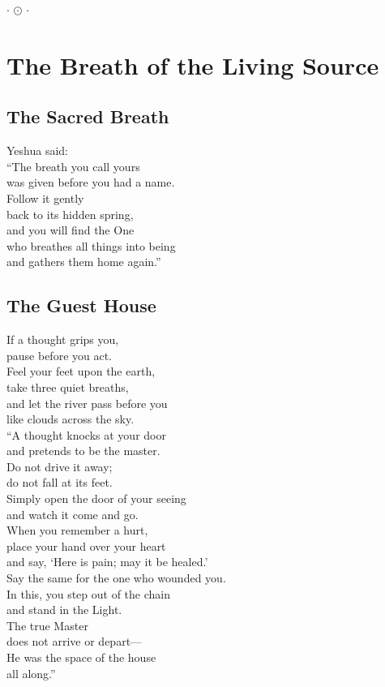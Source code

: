 \documentclass[10pt, openright]{book}
\newcommand{\sectionbreak}{\filbreak}
\newcommand{\ornament}{
    \vspace{1.5cm}
    \begin{center}
        \large \(\cdot\) \(\odot\) \(\cdot\)
    \end{center}
    \vspace{1.5cm}
}
\begin{document}
\ornament

\mainmatter

\chapter{The Breath of the Living
Source}\label{the-breath-of-the-living-source}

\sectionbreak

\section{The Sacred Breath}\label{the-sacred-breath}

Yeshua said:\\
``The breath you call yours\\
was given before you had a name.\\
Follow it gently\\
back to its hidden spring,\\
and you will find the One\\
who breathes all things into being\\
and gathers them home again.''

\sectionbreak

\section{The Guest House}\label{the-guest-house}

If a thought grips you,\\
pause before you act.\\
Feel your feet upon the earth,\\
take three quiet breaths,\\
and let the river pass before you\\
like clouds across the sky.\\
``A thought knocks at your door\\
and pretends to be the master.\\
Do not drive it away;\\
do not fall at its feet.\\
Simply open the door of your seeing\\
and watch it come and go.\\
When you remember a hurt,\\
place your hand over your heart\\
and say, `Here is pain; may it be healed.'\\
Say the same for the one who wounded you.\\
In this, you step out of the chain\\
and stand in the Light.\\
The true Master\\
does not arrive or depart---\\
He was the space of the house\\
all along.''
\end{document}
